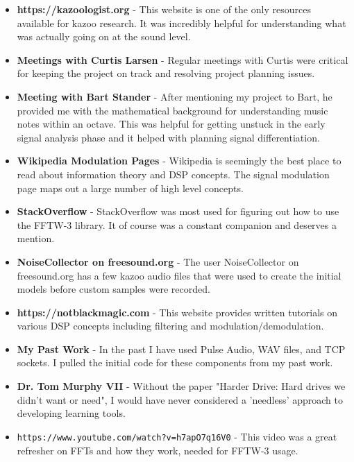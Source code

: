 \documentclass[]{article}
\begin{document}
\begin{itemize}
  \item \textbf{https://kazoologist.org} - This website is one of the only resources available for kazoo research. It was incredibly helpful for understanding what was actually going on at the sound level.

  \item \textbf{Meetings with Curtis Larsen} - Regular meetings with Curtis were critical for keeping the project on track and resolving project planning issues.

  \item \textbf{Meeting with Bart Stander} - After mentioning my project to Bart, he provided me with the mathematical background for understanding music notes within an octave. This was helpful for getting unstuck in the early signal analysis phase and it helped with planning signal differentiation.

  \item \textbf{Wikipedia Modulation Pages} - Wikipedia is seemingly the best place to read about information theory and DSP concepts. The signal modulation page maps out a large number of high level concepts.

  \item \textbf{StackOverflow} - StackOverflow was most used for figuring out how to use the FFTW-3 library. It of course was a constant companion and deserves a mention.

  \item \textbf{NoiseCollector on freesound.org} - The user NoiseCollector on freesound.org has a few kazoo audio files that were used to create the initial models before custom samples were recorded.

  \item \textbf{https://notblackmagic.com} - This website provides written tutorials on various DSP concepts including filtering and modulation/demodulation.

  \item \textbf{My Past Work} - In the past I have used Pulse Audio, WAV files, and TCP sockets. I pulled the initial code for these components from my past work.
  
  \item \textbf{Dr. Tom Murphy VII} - Without the paper "Harder Drive: Hard drives we didn't want or need", I would have never considered a 'needless' approach to developing learning tools.

  \item \texttt{https://www.youtube.com/watch?v=h7apO7q16V0} - This video was a great refresher on FFTs and how they work, needed for FFTW-3 usage.

\end{itemize}
\end{document}
